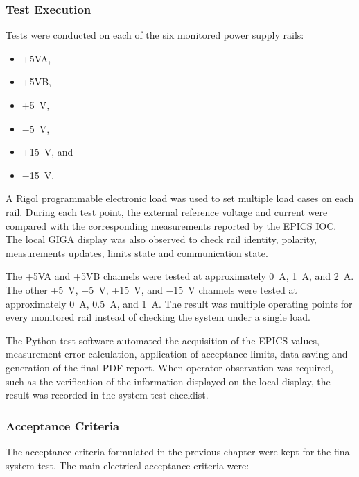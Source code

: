 \subsubsection{Test Execution}

Tests were conducted on each of the six monitored power supply rails:

\begin{itemize}
    \item +5VA,
    \item +5VB,
    \item +5~V,
    \item $-$5~V,
    \item +15~V, and
    \item $-$15~V.
\end{itemize}

A Rigol programmable electronic load was used to set multiple load cases on each rail. During each test point, the external reference voltage and current were compared with the corresponding measurements reported by the EPICS IOC. The local GIGA display was also observed to check rail identity, polarity, measurements updates, limits state and communication state.

The +5VA and +5VB channels were tested at approximately 0~A, 1~A, and 2~A. The other +5~V, $-$5~V, +15~V, and $-$15~V channels were tested at approximately 0~A, 0.5~A, and 1~A. The result was multiple operating points for every monitored rail instead of checking the system under a single load.

The Python test software automated the acquisition of the EPICS values, measurement error calculation, application of acceptance limits, data saving and generation of the final PDF report. When operator observation was required, such as the verification of the information displayed on the local display, the result was recorded in the system test checklist.

\subsubsection{Acceptance Criteria}

The acceptance criteria formulated in the previous chapter were kept for the final system test. The main electrical acceptance criteria were:

